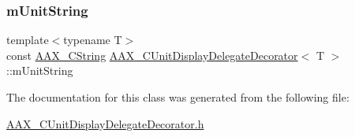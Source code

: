 \subsubsection{\texorpdfstring{mUnitString}{mUnitString}}
{\footnotesize\ttfamily template$<$typename T$>$ \\
const \mbox{\hyperlink{a01573}{A\+A\+X\+\_\+\+C\+String}} \mbox{\hyperlink{a01585}{A\+A\+X\+\_\+\+C\+Unit\+Display\+Delegate\+Decorator}}$<$ T $>$\+::m\+Unit\+String\hspace{0.3cm}{\ttfamily [protected]}}



The documentation for this class was generated from the following file\+:\begin{DoxyCompactItemize}
\item 
\mbox{\hyperlink{a00482}{A\+A\+X\+\_\+\+C\+Unit\+Display\+Delegate\+Decorator.\+h}}\end{DoxyCompactItemize}

